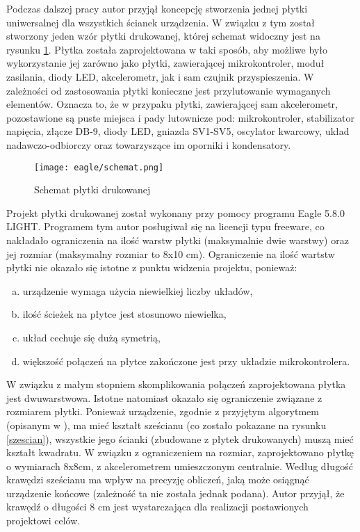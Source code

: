 Podczas dalszej pracy autor przyjął koncepcję stworzenia jednej płytki uniwersalnej dla wszystkich ścianek urządzenia. W związku z tym został stworzony jeden wzór płytki drukowanej, której schemat widoczny jest na rysunku \ref{plytka}. Płytka została zaprojektowana w taki sposób, aby możliwe było wykorzystanie jej zarówno jako płytki, zawierającej mikrokontroler, moduł zasilania, diody LED, akcelerometr, jak i sam czujnik przyspieszenia. W zależności od zastosowania płytki konieczne jest przylutowanie wymaganych elementów. Oznacza to, że w przypaku płytki, zawierającej sam akcelerometr, pozostawione są puste miejsca i pady lutownicze pod: mikrokontroler, stabilizator napięcia, złącze DB-9, diody LED, gniazda SV1-SV5, oscylator kwarcowy, układ nadawczo-odbiorczy oraz towarzyszące im oporniki i kondensatory.

\begin{figure}[ht]
  \centering
\texttt{[image: eagle/schemat.png]}
 \caption{Schemat płytki drukowanej}
\label{plytka}
\end{figure}
\bigskip
Projekt płytki drukowanej został wykonany przy pomocy programu Eagle 5.8.0 LIGHT. Programem tym autor posługiwał się na licencji typu freeware, co nakładało ograniczenia na ilość warstw płytki (maksymalnie dwie warstwy) oraz jej rozmiar (maksymalny rozmiar to 8x10 cm). Ograniczenie na ilość wartstw płytki nie okazało się istotne z punktu widzenia projektu, ponieważ:
\begin{enumerate}[a)]
	\item urządzenie wymaga użycia niewielkiej liczby układów,
	\item ilość ścieżek na płytce jest stosunowo niewielka,
	\item układ cechuje się dużą symetrią,
	\item większość połączeń na płytce zakończone jest przy układzie mikrokontrolera.
\end{enumerate}
W związku z małym stopniem skomplikowania połączeń zaprojektowana płytka jest dwuwarstwowa.
Istotne natomiast okazało się ograniczenie związane z rozmiarem płytki. Ponieważ urządzenie, zgodnie z przyjętym algorytmem (opisanym w \cite{Tan00}), ma mieć kształt sześcianu (co zostało pokazane na rysunku \ref{szescian}), wszystkie jego ścianki (zbudowane z płytek drukowanych) muszą mieć kształt kwadratu. W związku z ograniczeniem na rozmiar, zaprojektowano płytkę o wymiarach 8x8cm, z akcelerometrem umieszczonym centralnie. Według \cite{Tan00} długość krawędzi sześcianu ma wpływ na precyzję obliczeń, jaką może osiągnąć urządzenie końcowe (zależność ta nie została jednak podana). Autor przyjął, że krawędź o długości 8 cm jest wystarczająca dla realizacji postawionych projektowi celów.

